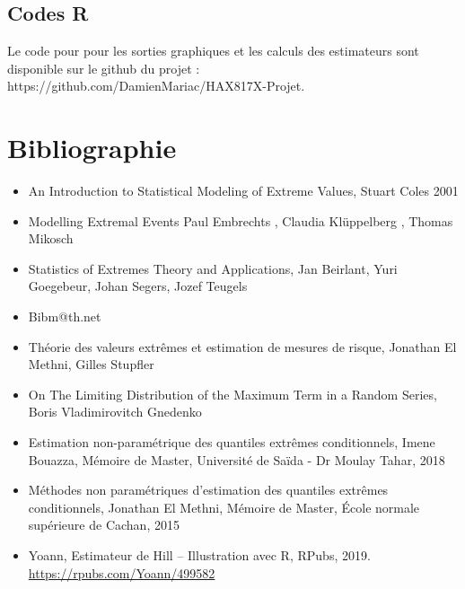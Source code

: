 \documentclass{article}
\theoremstyle{plain}
\theoremstyle{definition}
\theoremstyle{plain}
\begin{document}
\subsection{Codes R}

\noindent Le code pour pour les sorties graphiques et les calculs des estimateurs sont disponible sur le github du projet : https://github.com/DamienMariac/HAX817X-Projet.

\newpage
\section*{Bibliographie}

\begin{itemize}
	\item An Introduction to Statistical Modeling of Extreme Values, Stuart Coles 2001
	\item Modelling Extremal Events  Paul Embrechts , Claudia Klüppelberg , Thomas Mikosch
	\item Statistics of Extremes Theory and Applications, Jan Beirlant, Yuri Goegebeur, Johan Segers, Jozef Teugels
	\item Bibm@th.net
	\item Théorie des valeurs extrêmes et estimation de mesures de risque, Jonathan El Methni, Gilles Stupfler
	\item On The Limiting Distribution of the Maximum Term in a Random Series, Boris Vladimirovitch Gnedenko
	\item Estimation non-paramétrique des quantiles extrêmes conditionnels, Imene Bouazza, Mémoire de Master, Université de Saïda - Dr Moulay Tahar, 2018
	\item Méthodes non paramétriques d’estimation des quantiles extrêmes conditionnels, Jonathan El Methni, Mémoire de Master, École normale supérieure de Cachan, 2015
	\item Yoann, Estimateur de Hill – Illustration avec R, RPubs, 2019. \url{https://rpubs.com/Yoann/499582}
\end{itemize}
\end{document}
